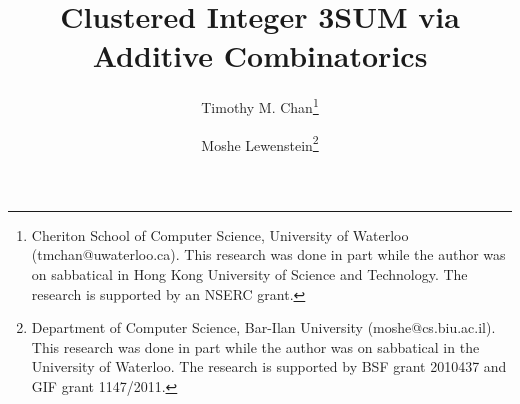\documentclass[11pt]{article}
\begin{document}
\sloppypar
\title{Clustered Integer 3SUM via Additive Combinatorics}
\author{Timothy M. Chan\thanks{Cheriton School of Computer Science, University of Waterloo
(tmchan@uwaterloo.ca).  This research was done in part while
the author was on sabbatical in
Hong Kong University of Science and Technology.
The research is supported by an NSERC grant.}
 \and Moshe Lewenstein\thanks{Department of Computer Science, Bar-Ilan University
(moshe@cs.biu.ac.il).
This research was done in part while the author was on sabbatical in the University of Waterloo. The research is supported by BSF grant 2010437 and GIF grant 1147/2011.}}

\date{}
\maketitle
\setcounter{page}{0}
\thispagestyle{empty}
\end{document}
